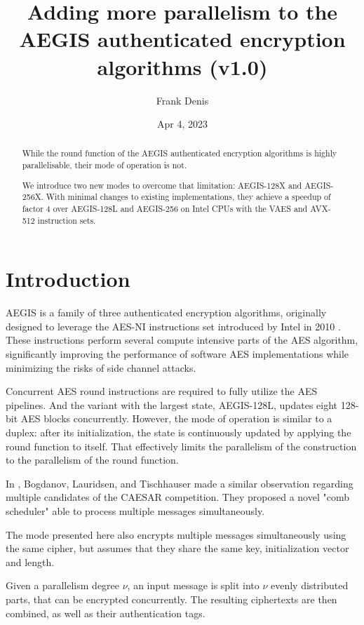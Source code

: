 \documentclass[envcountsame,runningheads,notitlepage]{llncs}
\title{Adding more parallelism to the AEGIS authenticated encryption algorithms (v1.0)}
\date{Apr 4, 2023}
\author{
  Frank Denis\inst{}
}
\institute{Fastly Inc.\\
  \href{mailto:fde@00f.net}{fde@00f.net}
}
\author{}
\institute{}
\begin{document}
\maketitle

\markboth{}{}

\begin{abstract}
  While the round function of the AEGIS authenticated encryption algorithms is highly parallelisable, their mode of operation is not.

  We introduce two new modes to overcome that limitation: AEGIS-128X and AEGIS-256X. With minimal changes to existing implementations, they achieve a speedup of factor 4 over AEGIS-128L and AEGIS-256 on Intel CPUs with the VAES and AVX-512 instruction sets.
\end{abstract}

\section{Introduction}
\label{sec:introduction}

AEGIS \cite{SAC:WuPre13} is a family of three authenticated encryption algorithms, originally designed to leverage the AES-NI instructions set introduced by Intel in 2010 \cite{Akdemir2010BreakthroughAP}.
These instructions perform several compute intensive parts of the AES algorithm, significantly improving the performance of software AES implementations while minimizing the risks of side channel attacks.

Concurrent AES round instructions are required to fully utilize the AES pipelines.
And the variant with the largest state, AEGIS-128L, updates eight 128-bit AES blocks concurrently.
However, the mode of operation is similar to a duplex: after its initialization, the state is continuously updated by applying the round function to itself.
That effectively limits the parallelism of the construction to the parallelism of the round function.

In \cite{FSE:BogLauTis15}, Bogdanov, Lauridsen, and Tischhauser made a similar observation regarding multiple candidates of the CAESAR competition. They proposed a novel "comb scheduler" able to process multiple messages simultaneously.

The mode presented here also encrypts multiple messages simultaneously using the same cipher, but assumes that they share the same key, initialization vector and length.

Given a parallelism degree $\nu$, an input message is split into $\nu$ evenly distributed parts, that can be encrypted concurrently. The resulting ciphertexts are then combined, as well as their authentication tags.
\end{document}
